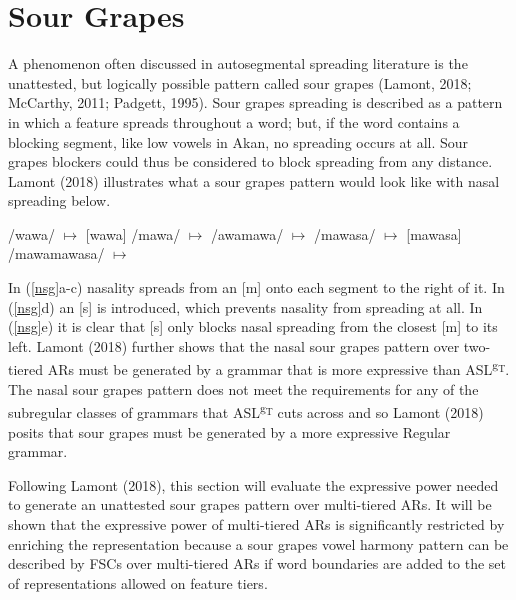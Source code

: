 \documentclass[,doc,floatsintext]{apa6}
\theoremstyle{definition}
\theoremstyle{definition}
\theoremstyle{definition}
\theoremstyle{remark}
\begin{document}
\section{Sour Grapes}\label{sour-grapes}

A phenomenon often discussed in autosegmental spreading literature is
the unattested, but logically possible pattern called sour grapes
(Lamont, 2018; McCarthy, 2011; Padgett, 1995). Sour grapes spreading is
described as a pattern in which a feature spreads throughout a word;
but, if the word contains a blocking segment, like low vowels in Akan,
no spreading occurs at all. Sour grapes blockers could thus be
considered to block spreading from any distance. Lamont (2018)
illustrates what a sour grapes pattern would look like with nasal
spreading below. \newpage

\begin{exe}
\label{nsg}
\begin{xlist}
  \ex /wawa/ $\mapsto$ [wawa]
  \ex /mawa/ $\mapsto$ \textipa{[m\~a\~w\~a]}
  \ex /awamawa/ $\mapsto$ \textipa{[awam\~a\~w\~a]}
  \ex /mawasa/ $\mapsto$ [mawasa]
  \ex /mawamawasa/ $\mapsto$ \textipa{[m\~a\~w\~amawasa]}
\end{xlist}
\end{exe}

\noindent In (\ref{nsg}a-c) nasality spreads from an {[}m{]} onto each
segment to the right of it. In (\ref{nsg}d) an {[}s{]} is introduced,
which prevents nasality from spreading at all. In (\ref{nsg}e) it is
clear that {[}s{]} only blocks nasal spreading from the closest {[}m{]}
to its left. Lamont (2018) further shows that the nasal sour grapes
pattern over two-tiered ARs must be generated by a grammar that is more
expressive than ASL\textsuperscript{g\textsubscript{T}}. The nasal sour
grapes pattern does not meet the requirements for any of the subregular
classes of grammars that ASL\textsuperscript{g\textsubscript{T}} cuts
across and so Lamont (2018) posits that sour grapes must be generated by
a more expressive Regular grammar.

Following Lamont (2018), this section will evaluate the expressive power
needed to generate an unattested sour grapes pattern over multi-tiered
ARs. It will be shown that the expressive power of multi-tiered ARs is
significantly restricted by enriching the representation because a sour
grapes vowel harmony pattern can be described by FSCs over multi-tiered
ARs if word boundaries are added to the set of representations allowed
on feature tiers.
\end{document}
